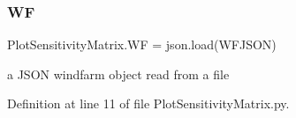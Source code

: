 \mbox{\label{namespace_plot_sensitivity_matrix_ab3a981e10a7fb62fd0803b775cfc9c6e}} 
\subsubsection{\texorpdfstring{WF}{WF}}
{\footnotesize\ttfamily Plot\+Sensitivity\+Matrix.\+WF = json.\+load(W\+F\+J\+S\+ON)}



a J\+S\+ON windfarm object read from a file 



Definition at line 11 of file Plot\+Sensitivity\+Matrix.\+py.


